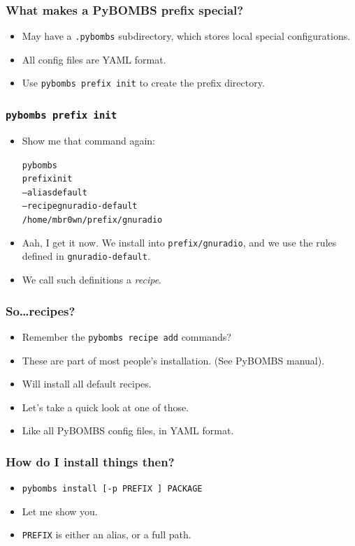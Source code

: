 \documentclass{beamer}
\begin{document}
\begin{frame}
  \frametitle{What makes a PyBOMBS prefix special?}
  \begin{itemize}
    \item May have a \texttt{.pybombs} subdirectory, which stores local special configurations.
    \item All config files are YAML format.
    \item Use \texttt{pybombs prefix init} to create the prefix directory.
  \end{itemize}
\end{frame}


\begin{frame}
  \frametitle{\texttt{pybombs prefix init}}
  \begin{itemize}
    \item Show me that command again:
      \begin{alltt}
      pybombs\\
          prefix init \\
          --alias default \\
          --recipe gnuradio-default \\
          /home/mbr0wn/prefix/gnuradio
      \end{alltt}
    \item Aah, I get it now. We install into \texttt{prefix/gnuradio}, and we use the rules defined in \texttt{gnuradio-default}.
    \item We call such definitions a \emph{recipe}.
  \end{itemize}
\end{frame}

\begin{frame}
  \frametitle{So\ldots recipes?}
  \begin{itemize}
    \item Remember the \texttt{pybombs recipe add} commands?
    \item These are part of most people's installation. (See PyBOMBS manual).
    \item Will install all default recipes.
    \item Let's take a quick look at one of those.
    \item Like all PyBOMBS config files, in YAML format.
  \end{itemize}
\end{frame}

\begin{frame}
  \frametitle{How do I install things then?}
  \begin{itemize}
    \item \texttt{pybombs install [-p PREFIX ] PACKAGE}
    \item Let me show you.
    \item \texttt{PREFIX} is either an alias, or a full path.
  \end{itemize}
\end{frame}
\end{document}
